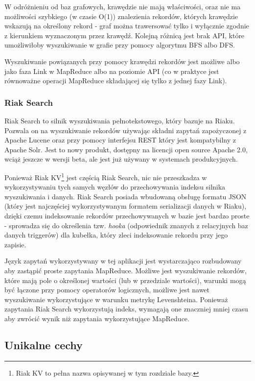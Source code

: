 W odróżnieniu od baz grafowych, krawędzie nie mają właściwości, oraz nie ma możliwości szybkiego (w czasie O(1)) znalezienia rekordów, których krawędzie wskazują na określony rekord - graf można trawersować tylko i wyłącznie zgodnie z kierunkiem wyznaczonym przez krawędź.
Kolejną różnicą jest brak API, które umożliwiłoby wyszukiwanie w grafie przy pomocy algorytmu BFS albo DFS.

Wyszukiwanie powiązanych przy pomocy krawędzi rekordów jest możliwe albo jako faza Link w MapReduce albo na poziomie API (co w praktyce jest równoważne operacji MapReduce składającej się tylko z jednej fazy Link).

\subsubsection*{Riak Search}

Riak Search to silnik wyszukiwania pełnotekstowego, który bazuje na Riaku. 
Pozwala on na wyszukiwanie rekordów używając składni zapytań zapożyczonej z Apache Lucene oraz przy pomocy interfejsu REST który jest kompatybilny z Apache Solr.
Jest to nowy produkt, dostępny na licencji open source Apache 2.0, wciąż jeszcze w wersji beta, ale jest już używany w systemach produkcyjnych.

Ponieważ Riak KV\footnote{Riak KV to pełna nazwa opisywanej w tym rozdziale bazy.} jest częścią Riak Search, nic nie przeszkadza w wykorzystywaniu tych samych węzłów do przechowywania indeksu silnika wyszukiwania i danych.
Riak Search posiada wbudowaną obsługę formatu JSON (który jest najczęściej wykorzystywanym formatem serializacji danych w Riaku), dzięki czemu indeksowanie rekordów przechowywanych w bazie jest bardzo proste - sprowadza się do określenia tzw. \emph{hooka} (odpowiednik znanych z relacyjnych baz danych triggerów) dla kubełka, który zleci indeksowanie rekordu przy jego zapisie.

Język zapytań wykorzystywany w tej aplikacji jest wystarczająco rozbudowany aby zastąpić proste zapytania MapReduce.
Możliwe jest wyszukiwanie rekordów, które mają pole o określonej wartości (lub w przedziale wartości), warunki mogą być łączone przy pomocy operatorów logicznych, możliwe jest nawet wyszukiwanie wykorzystujące w warunku metrykę Levenshteina.
Ponieważ zapytania Riak Search wykorzystują indeks, wymagają one znaczniej mniej czasu aby zwrócić wynik niż zapytania wykorzystujące MapReduce.

\subsection*{Unikalne cechy}

